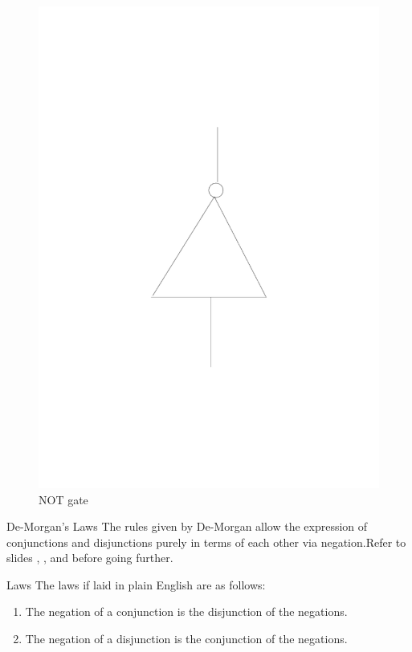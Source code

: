 \documentclass{beamer}
\begin{document}
\begin{frame}
\begin{figure}
\includegraphics[scale=0.2]{../beamer_bib/not} 
\caption{NOT gate}
\end{figure}
\end{frame}
\begin{frame}{De-Morgan's Laws}
The rules given by De-Morgan allow the expression of conjunctions and disjunctions purely in terms of each other via negation.Refer to slides \pageref{AND}, \pageref{OR}, and \pageref{NOT} before going further.
\pause
\begin{block}{Laws}
The laws if laid in plain English are as follows:
\begin{enumerate}
\item The negation of a conjunction is the disjunction of the negations.
\item The negation of a disjunction is the conjunction of the negations.
\end{enumerate}
\end{block}
\end{frame}
\end{document}
